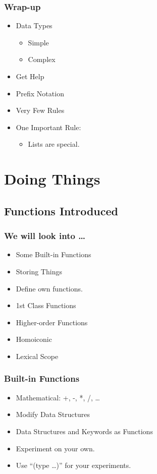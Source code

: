 \documentclass{beamer}
\begin{document}
  \begin{frame}
      \frametitle{Wrap-up}

      \begin{itemize}
          \item Data Types
              \begin{itemize}
                  \item Simple
                  \item Complex
              \end{itemize}
          \item Get Help
          \item Prefix Notation
          \item Very Few Rules
          \item One Important Rule:
              \begin{itemize}
                  \item Lists are special.
              \end{itemize}
      \end{itemize}
  \end{frame}


  \section{Doing Things}
  \subsection{Functions Introduced}

  \begin{frame}
      \frametitle{We will look into \ldots}

      \begin{itemize}
          \item Some Built-in Functions
          \item Storing Things
          \item Define own functions.
          \item 1st Class Functions
          \item Higher-order Functions
          \item Homoiconic
          \item Lexical Scope
      \end{itemize}
  \end{frame}

  \begin{frame}
      \frametitle{Built-in Functions}

      \begin{itemize}
          \item Mathematical: +, -, *, /, \ldots
          \item Modify Data Structures
          \item Data Structures and Keywords as Functions
          \item Experiment on your own.
          \item Use ``(type \ldots)'' for your experiments.
      \end{itemize}
  \end{frame}
\end{document}
